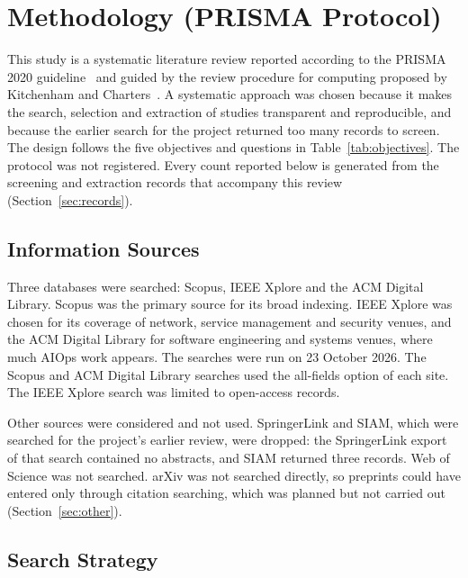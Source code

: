 \section{Methodology (PRISMA Protocol)}
\label{sec:method}

This study is a systematic literature review reported according to the PRISMA 2020 guideline~\cite{page2021} and guided by the review procedure for computing proposed by Kitchenham and Charters~\cite{kitchenham2007}. A systematic approach was chosen because it makes the search, selection and extraction of studies transparent and reproducible, and because the earlier search for the project returned too many records to screen. The design follows the five objectives and questions in Table~\ref{tab:objectives}. The protocol was not registered. Every count reported below is generated from the screening and extraction records that accompany this review (Section~\ref{sec:records}).

\subsection{Information Sources}

Three databases were searched: Scopus, IEEE Xplore and the ACM Digital Library. Scopus was the primary source for its broad indexing. IEEE Xplore was chosen for its coverage of network, service management and security venues, and the ACM Digital Library for software engineering and systems venues, where much AIOps work appears. The searches were run on 23 October 2026. The Scopus and ACM Digital Library searches used the all-fields option of each site. The IEEE Xplore search was limited to open-access records.

Other sources were considered and not used. SpringerLink and SIAM, which were searched for the project's earlier review, were dropped: the SpringerLink export of that search contained no abstracts, and SIAM returned three records. Web of Science was not searched. arXiv was not searched directly, so preprints could have entered only through citation searching, which was planned but not carried out (Section~\ref{sec:other}).

\subsection{Search Strategy}

